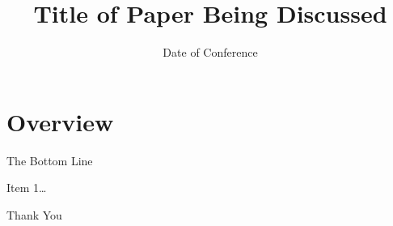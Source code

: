 \documentclass[notes,11pt, aspectratio=169]{beamer}
\title{Title of Paper Being Discussed}
\author[Short Name (U ABC)]{%
  \texorpdfstring{%
    \begin{columns}
      \column{.3\linewidth}
      \centering
      Author 1 \\ Institution 1
      \column{.3\linewidth}
      \centering
      Author 2 \\ Institution 2
      \column{.3\linewidth}
      \centering
      Author 3 \\ Institution 3
    \end{columns}
 }
 {Author 1, Author 2, Author 3}
}
\date{Date of Conference} %
\newenvironment{wideitemize}{\itemize\addtolength{\itemsep}{1em}}{\enditemize}
\begin{document}
{ 
\frame{\titlepage}}

\section*{Overview}

\begin{frame}{The Bottom Line}
\begin{wideitemize}
    \item Item 1\ldots
\end{wideitemize}
\end{frame}


\begin{frame}{}
\center
Thank You

\end{frame}
\end{document}
